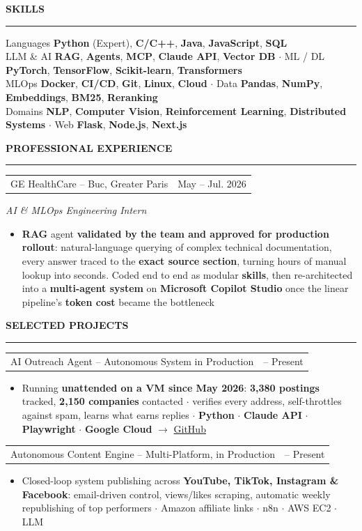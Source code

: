 \documentclass[10pt, a4paper]{article}
\makeatletter
\newcommand{\headfont}{\sffamily}
\newlength{\mainInner}\setlength{\mainInner}{\textwidth}
\providecommand{\cvFit}{1.0}
\newlength{\cvgap}
\newcommand{\vgap}[1]{\setlength{\cvgap}{#1}\vspace{\cvFit\cvgap}}
\newcommand{\mainSection}[1]{%
  \vgap{6pt}%
  {\headfont\color{sectionColor}\fontsize{10pt}{11.5pt}\selectfont\bfseries\MakeUppercase{#1}}\par%
  \nointerlineskip\vgap{2pt}%
  {\color{ruleColor}\rule{\mainInner}{0.8pt}}\par\vgap{4pt}%
}
\newcommand{\cvEntry}[4]{%
  \begin{tabularx}{\mainInner}{@{}X r@{}}
    {\headfont\fontsize{10pt}{11.5pt}\selectfont #1} &
    {\headfont\color{mutedText}\fontsize{8.5pt}{10pt}\selectfont #3}
  \end{tabularx}\par\vspace{1pt}%
  {\color{subtitleColor}\fontsize{9.5pt}{10pt}\selectfont\itshape #2}\par
  #4\vgap{6pt}%
}
\newcommand{\cvProject}[3]{%
  \begin{tabularx}{\mainInner}{@{}X r@{}}
    {\headfont\fontsize{10pt}{11.5pt}\selectfont #1} &
    {\headfont\color{mutedText}\fontsize{8.5pt}{10pt}\selectfont #2}
  \end{tabularx}\par\vspace{1pt}%
  #3\vgap{5pt}%
}
\newcommand{\cvBullets}[1]{%
  \vspace{2pt}%
  \begin{itemize}[leftmargin=10pt,itemsep=1pt,topsep=0pt,partopsep=0pt,parsep=0pt,
    label={\color{gold}\small$\bullet$}]
    #1
  \end{itemize}%
}
\newcommand{\cvItem}[1]{\item{\fontsize{8.8pt}{10.8pt}\selectfont #1}}
\makeatother
\begin{document}
\begin{lrbox}{\cvMainBox}
\begin{minipage}[t]{\mainInner}
  \mainSection{Skills}
  {\fontsize{9pt}{12.5pt}\selectfont
{\color{mutedText}Languages} \textbf{Python} (Expert), \textbf{C/C++}, \textbf{Java}, \textbf{JavaScript}, \textbf{SQL}\\
{\color{mutedText}LLM \& AI} \textbf{RAG}, \textbf{Agents}, \textbf{MCP}, \textbf{Claude API}, \textbf{Vector DB} $\cdot$ {\color{mutedText}ML / DL} \textbf{PyTorch}, \textbf{TensorFlow}, \textbf{Scikit-learn}, \textbf{Transformers}\\
{\color{mutedText}MLOps} \textbf{Docker}, \textbf{CI/CD}, \textbf{Git}, \textbf{Linux}, \textbf{Cloud} $\cdot$ {\color{mutedText}Data} \textbf{Pandas}, \textbf{NumPy}, \textbf{Embeddings}, \textbf{BM25}, \textbf{Reranking}\\
{\color{mutedText}Domains} \textbf{NLP}, \textbf{Computer Vision}, \textbf{Reinforcement Learning}, \textbf{Distributed Systems} $\cdot$ {\color{mutedText}Web} \textbf{Flask}, \textbf{Node.js}, \textbf{Next.js}
\par
  }
  \vgap{2pt}

  \mainSection{Professional Experience}
  \cvEntry{GE HealthCare -- Buc, Greater Paris}
    {AI \& MLOps Engineering Intern}
    {May -- Jul. 2026}{%
    \cvBullets{
      \cvItem{\textbf{RAG} agent \textbf{validated by the team and approved for production rollout}: natural-language querying of complex technical documentation, every answer traced to the \textbf{exact source section}, turning hours of manual lookup into seconds. Coded end to end as modular \textbf{skills}, then re-architected into a \textbf{multi-agent system} on \textbf{Microsoft Copilot Studio} once the linear pipeline's \textbf{token cost} became the bottleneck}
    }
  }

  \mainSection{Selected Projects}
  \cvProject{AI Outreach Agent -- Autonomous System in Production}
    {2026 -- Present}{%
    \cvBullets{
      \cvItem{Running \textbf{unattended on a VM since May 2026}: \textbf{3,380 postings} tracked, \textbf{2,150 companies} contacted $\cdot$ verifies every address, self-throttles against spam, learns what earns replies $\cdot$ \textbf{Python} $\cdot$ \textbf{Claude API} $\cdot$ \textbf{Playwright} $\cdot$ \textbf{Google Cloud} $\to$ \href{https://github.com/ZinebMEFTAH/stationf-outreach-agent}{GitHub}}
    }
  }

  \cvProject{Autonomous Content Engine -- Multi-Platform, in Production}
    {2026 -- Present}{%
    \cvBullets{
      \cvItem{Closed-loop system publishing across \textbf{YouTube, TikTok, Instagram \& Facebook}: email-driven control, views/likes scraping, automatic weekly republishing of top performers $\cdot$ Amazon affiliate links $\cdot$ n8n $\cdot$ AWS EC2 $\cdot$ LLM}
    }
  }


\end{minipage}
\end{lrbox}
\end{document}
